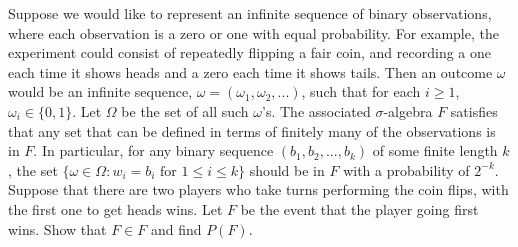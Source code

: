 \documentclass{article}
\begin{document}
\begin{question}
Suppose we would like to represent an infinite sequence of binary observations, where each observation is a zero or one with equal probability. For example, the experiment could consist of repeatedly flipping a fair coin, and recording a one each time it shows heads and a zero each time it shows tails. Then an outcome \( \omega \) would be an infinite sequence, \( \omega = (\omega_1, \omega_2, ...) \), such that for each \(i \geq 1\), \( \omega_i \in \{0, 1\} \). Let \( \Omega \) be the set of all such \( \omega \)’s. The associated \( \sigma \)-algebra \( F \) satisfies that any set that can be defined in terms of finitely many of the observations is in \( F \). In particular, for any binary sequence \( (b_1, b_2, ..., b_k) \) of some finite length \( k \), the set \( \{ \omega \in \Omega : w_i = b_i \text{ for } 1 \leq i \leq k \} \) should be in \( F \) with a probability of \( 2^{-k} \). Suppose that there are two players who take turns performing the coin flips, with the first one to get heads wins. Let \( F \) be the event that the player going first wins. Show that \( F \in F \) and find \( P(F) \).
\end{question}
\end{document}
